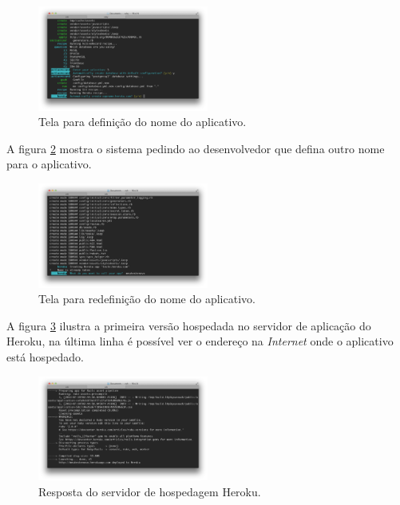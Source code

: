 \begin{figure}[h]
  \centering
  \includegraphics[width=0.5\textwidth]{./fig/setup3}
  \caption{Tela para defini\c{c}\~ao do nome do aplicativo.}
  \label{fig:fig8}
\end{figure}

\pagebreak

A figura \ref{fig:fig9} mostra o sistema pedindo ao desenvolvedor que defina outro nome para o aplicativo.

\begin{figure}[h]
  \centering
  \includegraphics[width=0.5\textwidth]{./fig/setup4}
  \caption{Tela para redefini\c{c}\~ao do nome do aplicativo.}
  \label{fig:fig9}
\end{figure}

A figura \ref{fig:fig10} ilustra a primeira vers\~ao hospedada no servidor de aplica\c{c}\~ao do Heroku, na \'ultima linha \'e poss\'ivel ver o endere\c{c}o na \emph{Internet} onde o aplicativo est\'a hospedado.

\begin{figure}[h]
  \centering
  \includegraphics[width=0.5\textwidth]{./fig/setup5}
  \caption{Resposta do servidor de hospedagem Heroku.}
  \label{fig:fig10}
\end{figure}

